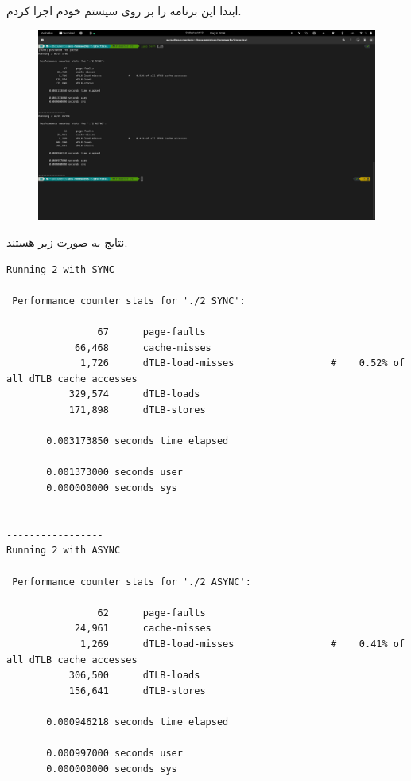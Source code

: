 \documentclass{article}
\begin{document}
\subsection{}
ابتدا این برنامه را بر روی سیستم خودم اجرا کردم.
\begin{figure}[H]
   \centering
   \includegraphics[width=\linewidth]{2-baremetal.png}
\end{figure}
نتایج به صورت زیر هستند.
\begin{latin}
\begin{lstlisting}
Running 2 with SYNC

 Performance counter stats for './2 SYNC':

                67      page-faults                                                           
            66,468      cache-misses                                                          
             1,726      dTLB-load-misses                 #    0.52% of all dTLB cache accesses
           329,574      dTLB-loads                                                            
           171,898      dTLB-stores                                                           

       0.003173850 seconds time elapsed

       0.001373000 seconds user
       0.000000000 seconds sys


-----------------
Running 2 with ASYNC

 Performance counter stats for './2 ASYNC':

                62      page-faults                                                           
            24,961      cache-misses                                                          
             1,269      dTLB-load-misses                 #    0.41% of all dTLB cache accesses
           306,500      dTLB-loads                                                            
           156,641      dTLB-stores                                                           

       0.000946218 seconds time elapsed

       0.000997000 seconds user
       0.000000000 seconds sys
\end{lstlisting}
\end{latin}
\end{document}

